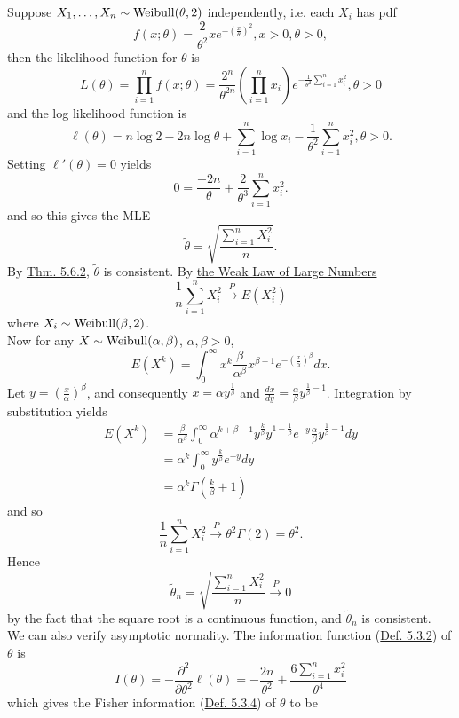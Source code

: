\documentclass[11pt,fleqn]{book} %
\begin{document}
\begin{example} \label{eg:566}
Suppose \(X_1, \ldots, X_n \sim \operatorname{Weibull}(\theta, 2)\) independently, i.e. each \(X_i\) has pdf
\[
f(x; \theta) = \frac{2}{\theta^2}xe^{-\left(\frac{x}{\theta}\right)^2}, x > 0, \theta > 0,
\]
then the likelihood function for \(\theta\) is
\[
L(\theta) = \prod_{i=1}^n f(x; \theta) = \frac{2^n}{\theta^{2n}}\left(\prod_{i=1}^n x_i\right) e^{-\frac{1}{\theta^2}\sum_{i=1}^n x_i^2}, \theta > 0
\]
and the log likelihood function is
\[
\ell(\theta) = n\log2 - 2n\log\theta + \sum_{i=1}^n\log x_i - \frac{1}{\theta^2}\sum_{i=1}^n x_i^2, \theta > 0.
\]
\indent Setting \(\ell'(\theta) = 0\) yields
\[
0 = \frac{-2n}{\theta} + \frac{2}{\theta^3} \sum_{i=1}^n x_i^2.
\]
and so this gives the MLE
\[
\tilde{\theta} = \sqrt{\frac{\sum_{i=1}^n X_i^2}{n}}.
\]
\indent By \hyperref[thm:562]{Thm. 5.6.2}, \(\tilde{\theta}\) is consistent. By \hyperref[thm:431]{the Weak Law of Large Numbers}
\[
\frac1n\sum_{i=1}^n X_i^2 \xrightarrow{P} E(X_i^2)
\]
where \(X_i \sim \operatorname{Weibull}(\beta, 2)\).\\
\indent Now for any \(X \sim \operatorname{Weibull}(\alpha, \beta)\), \(\alpha, \beta > 0\),
\[
E(X^k) = \int_0^\infty x^k \frac{\beta}{\alpha^\beta} x^{\beta - 1} e^{-\left(\frac{x}{\alpha}\right)^\beta} dx.
\]
\indent Let \(y = \left(\frac{x}{\alpha}\right)^\beta\), and consequently \(x = \alpha y^{\frac1\beta}\) and \(\frac{dx}{dy} = \frac{\alpha}{\beta}y^{\frac1\beta - 1}\). Integration by substitution yields
\[
\begin{aligned}
E(X^k) &= \frac{\beta}{\alpha^\beta} \int_0^\infty \alpha^{k + \beta - 1} y^{\frac{k}{\beta}}y^{1 - \frac1\beta} e^{-y}\frac{\alpha}{\beta} y^{\frac1\beta - 1} dy \\
&= \alpha^k \int_0^\infty y^{\frac{k}{\beta}} e^{-y}dy \\
&= \alpha^k \Gamma\left(\frac{k}{\beta} + 1\right)
\end{aligned}
\]
and so
\[
\frac1n\sum_{i=1}^n X_i^2 \xrightarrow{P} \theta^2\Gamma(2) = \theta^2.
\]
\indent Hence
\[
\tilde{\theta}_n = \sqrt{\frac{\sum_{i=1}^n X_i^2}{n}} \xrightarrow{P} 0
\]
by the fact that the square root is a continuous function, and \(\tilde{\theta}_n\) is consistent. \\
\indent We can also verify asymptotic normality. The information function (\hyperref[def:532]{Def. 5.3.2}) of \(\theta\) is
\[
I(\theta) = -\frac{\partial^2}{\partial\theta^2} \ell(\theta) = -\frac{2n}{\theta^2} + \frac{6\sum_{i=1}^n x_i^2}{\theta^4}
\]
which gives the Fisher information (\hyperref[def:534]{Def. 5.3.4}) of \(\theta\) to be

\end{example}
\end{document}
